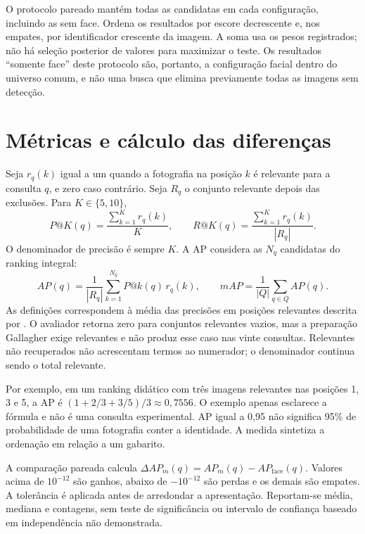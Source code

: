 O protocolo pareado mantém todas as candidatas em cada configuração, incluindo as sem face. Ordena os resultados por escore decrescente e, nos empates, por identificador crescente da imagem. A soma usa os pesos registrados; não há seleção posterior de valores para maximizar o teste. Os resultados ``somente face'' deste protocolo são, portanto, a configuração facial dentro do universo comum, e não uma busca que elimina previamente todas as imagens sem detecção.

\section{Métricas e cálculo das diferenças}
Seja $r_q(k)$ igual a um quando a fotografia na posição $k$ é relevante para a consulta $q$, e zero caso contrário. Seja $R_q$ o conjunto relevante depois das exclusões. Para $K\in\{5,10\}$,
\begin{equation}
 P@K(q)=\frac{\sum_{k=1}^{K}r_q(k)}{K},\qquad
 R@K(q)=\frac{\sum_{k=1}^{K}r_q(k)}{|R_q|}.
\end{equation}
O denominador de precisão é sempre $K$. A AP considera as $N_q$ candidatas do ranking integral:
\begin{equation}\label{eq:ap}
 AP(q)=\frac{1}{|R_q|}\sum_{k=1}^{N_q}P@k(q)\,r_q(k),
 \qquad mAP=\frac{1}{|Q|}\sum_{q\in Q}AP(q).
\end{equation}
As definições correspondem à média das precisões em posições relevantes descrita por . O avaliador retorna zero para conjuntos relevantes vazios, mas a preparação Gallagher exige relevantes e não produz esse caso nas vinte consultas. Relevantes não recuperados não acrescentam termos ao numerador; o denominador continua sendo o total relevante.

Por exemplo, em um ranking didático com três imagens relevantes nas posições 1, 3 e 5, a AP é $(1+2/3+3/5)/3\approx0{,}7556$. O exemplo apenas esclarece a fórmula e não é uma consulta experimental. AP igual a 0,95 não significa 95\% de probabilidade de uma fotografia conter a identidade. A medida sintetiza a ordenação em relação a um gabarito.

A comparação pareada calcula $\Delta AP_m(q)=AP_m(q)-AP_{\mathrm{face}}(q)$. Valores acima de $10^{-12}$ são ganhos, abaixo de $-10^{-12}$ são perdas e os demais são empates. A tolerância é aplicada antes de arredondar a apresentação. Reportam-se média, mediana e contagens, sem teste de significância ou intervalo de confiança baseado em independência não demonstrada.

